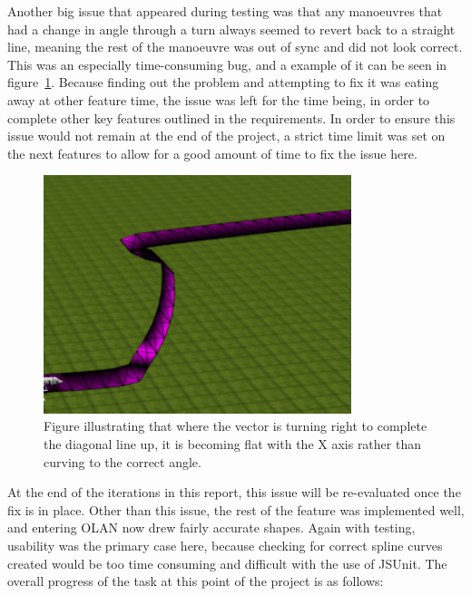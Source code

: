 Another big issue that appeared during testing was that any manoeuvres that had a change in angle through a turn always seemed to revert back to a straight line, meaning the rest of the manoeuvre was out of sync and did not look correct. This was an especially time-consuming bug, and a example of it can be seen in figure~\ref{fig:issue}. Because finding out the problem and attempting to fix it was eating away at other feature time, the issue was left for the time being, in order to complete other key features outlined in the requirements. In order to ensure this issue would not remain at the end of the project, a strict time limit was set on the next features to allow for a good amount of time to fix the issue here.

\begin{figure}[h]
  \centering
      \includegraphics[width=0.8\textwidth]{images/issue.png}
  \caption{Figure illustrating that where the vector is turning right to complete the diagonal line up, it is becoming flat with the X axis rather than curving to the correct angle.}
  \label{fig:issue}
\end{figure}

At the end of the iterations in this report, this issue will be re-evaluated once the fix is in place. Other than this issue, the rest of the feature was implemented well, and entering OLAN now drew fairly accurate shapes. Again with testing, usability was the primary case here, because checking for correct spline curves created would be too time consuming and difficult with the use of JSUnit. The overall progress of the task at this point of the project is as follows:

